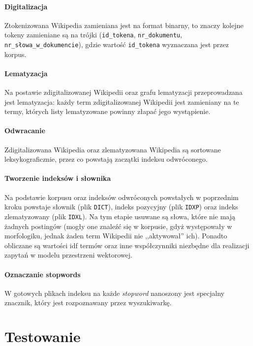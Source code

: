 \documentclass[a4paper,12pt]{article}
\begin{document}
\paragraph{Digitalizacja} Ztokenizowana Wikipedia zamieniana jest na format
binarny, to znaczy kolejne tokeny zamieniane są na trójki (\texttt{id\_tokena},
\texttt{nr\_dokumentu}, \texttt{nr\_słowa\_w\_dokumencie}), gdzie wartość
\texttt{id\_tokena} wyznaczana jest przez korpus.

\paragraph{Lematyzacja} Na postawie zdigitalizowanej Wikipedii oraz grafu
lematyzacji przeprowadzana jest lematyzacja: każdy term zdigitalizowanej
Wikipedii jest zamieniany na te termy, których listy lematyzowane powinny
złapać jego wystąpienie.

\paragraph{Odwracanie} Zdigitalizowana Wikipedia oraz zlematyzowana Wikipedia
są sortowane leksykograficznie, przez co powstają zaczątki indeksu odwróconego.

\paragraph{Tworzenie indeksów i słownika} Na podstawie korpusu oraz indeksów
odwróconych powstałych w poprzednim kroku powstaje słownik (plik
\texttt{DICT}), indeks pozycyjny (plik \texttt{IDXP}) oraz indeks zlematyzowany
(plik \texttt{IDXL}). Na tym etapie usuwane są słowa, które nie mają żadnych
postingów (mogły one znaleźć się w korpusie, gdyż występowały w morfologiku,
jednak żaden term Wikipedii nie ,,aktywował'' ich). Ponadto obliczane są
wartości idf termów oraz inne współczynniki niezbędne dla realizacji zapytań w
modelu przestrzeni wektorowej.

\paragraph{Oznaczanie stopwords} W gotowych plikach indeksu na każde
\textit{stopword} nanoszony jest specjalny znacznik, który jest rozpoznawany
przez wyszukiwarkę.

\section{Testowanie}
\end{document}
